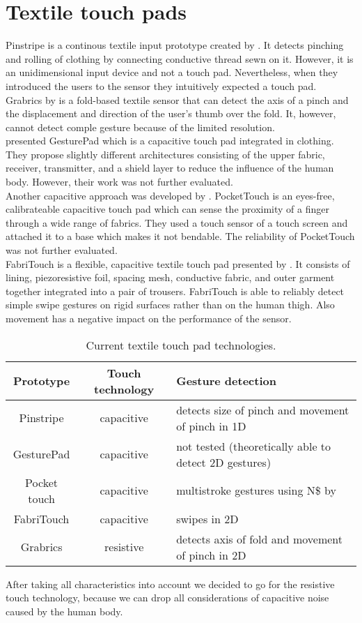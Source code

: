 \section{Textile touch pads}
Pinstripe is a continous textile input prototype created by \cite{Karrer:2010:PEC:1866218.1866255}. It detects pinching and rolling of clothing by connecting conductive thread sewn on it. However, it is an unidimensional input device and not a touch pad. Nevertheless, when they introduced the users to the sensor they intuitively expected a touch pad. \\
Grabrics by \cite{hamdan} is a fold-based textile sensor that can detect the axis of a pinch and the displacement and direction of the user’s thumb over the fold. It, however, cannot detect comple gesture because of the limited resolution.\\
\cite{Rekimoto:2001:962092} presented GesturePad which is a capacitive touch pad integrated in clothing. They propose slightly different architectures consisting of the upper fabric, receiver, transmitter, and a shield layer to reduce the influence of the human body. However, their work was not further evaluated. \\
Another capacitive approach was developed by \cite{Saponas:2011:PTC:2047196.2047235}. PocketTouch is an eyes-free, calibrateable capacitive touch pad which can sense the proximity of a finger through a wide range of fabrics. They used a touch sensor of a touch screen and attached it to a base which makes it not bendable. The reliability of PocketTouch was not further evaluated. \\
FabriTouch is a flexible, capacitive textile touch pad presented by \cite{Heller:2014:FEF:2634317.2634345}. It consists of lining, piezoresistive foil, spacing mesh, conductive fabric, and outer garment together integrated into a pair of trousers. FabriTouch is able to reliably detect simple swipe gestures on rigid surfaces rather than on the human thigh. Also movement has a negative impact on the performance of the sensor.
\begin{table}
\begin{tabular}{ | c | c | p{3.8cm}|}
\hline
  Prototype & Touch technology & Gesture detection \\
  \hline
   Pinstripe & capacitive  & detects size of pinch and movement of pinch in 1D \\
   \hline
  GesturePad & capacitive &  not tested (theoretically able to detect 2D gestures) \\
  \hline
  Pocket touch & capacitive & multistroke gestures using N\$ by \cite{anthony2012n} \\
  \hline
  FabriTouch & capacitive & swipes in 2D \\
  \hline
  Grabrics & resistive & detects axis of fold and movement of pinch in 2D \\ 
  \hline
\end{tabular}
\caption{Current textile touch pad technologies.}
 \label{table:overview}
\end{table}

After taking all characteristics into account we decided to go for the resistive touch technology, because we can drop all considerations of capacitive noise caused by the human body. 